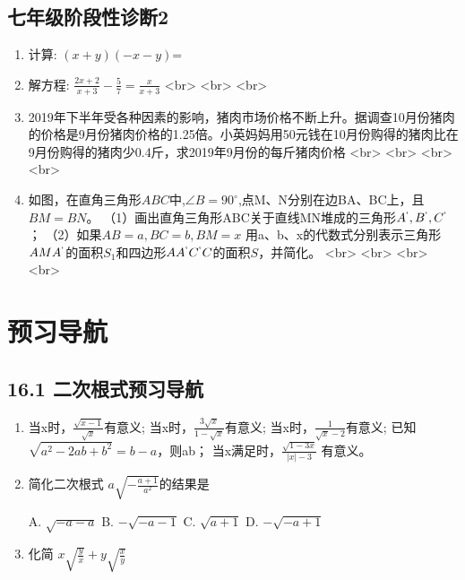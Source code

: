 \documentclass[UTF8]{ctexart}
\begin{document}
\subsection{七年级阶段性诊断2}

\begin{enumerate}

\item 计算: $(x+y)(-x-y)$=\underline{\quad\quad\quad}

\item 解方程: $\frac{2x+2}{x+3}-\frac{5}{7}=\frac{x}{x+3}$
   <br>
   <br>
   <br>

\item 2019年下半年受各种因素的影响，猪肉市场价格不断上升。据调查10月份猪肉的价格是9月份猪肉价格的1.25倍。小英妈妈用50元钱在10月份购得的猪肉比在9月份购得的猪肉少0.4斤，求2019年9月份的每斤猪肉价格
   <br>
   <br>
   <br>
   <br>

\item 如图，在直角三角形$ABC$中,$\angle B=90^\circ$,点M、N分别在边BA、BC上，且$BM=BN$。
   （1）画出直角三角形ABC关于直线MN堆成的三角形$A^`,B^`,C^`$；
   （2）如果$AB=a,BC=b,BM=x$ 用a、b、x的代数式分别表示三角形$AMA^`$的面积$S_1$和四边形$AA^`C^`C$的面积$S$，并简化。
   <br>
   <br>
   <br>
   <br>

 \end{enumerate}

\section{预习导航}

\subsection{16.1 二次根式预习导航}

\begin{enumerate}

\item 当x\underline{\quad\quad}时，$\frac{\sqrt{x-1}}{\sqrt{x}}$有意义;
   当x\underline{\quad\quad}时，$\frac{3\sqrt{x}}{1-\sqrt{x}}$有意义;
   当x\underline{\quad\quad}时，$\frac{1}{\sqrt{x}-2}$有意义;
   已知$\sqrt{a^2-2ab+b^2}=b-a$，则a\underline{\quad}b；
   当x满足\underline{\quad\quad}时，$\frac{\sqrt{1-3x}}{| x | - 3} $ 有意义。

\item 简化二次根式 $a\sqrt{-\frac{a+1}{a^2}}$的结果是\underline{\quad\quad}

    A. $\sqrt{-a-a}$
    B. $-\sqrt{-a-1}$
    C. $\sqrt{a+1}$
    D. $-\sqrt{-a+1}$
    
\item 化简 $x \sqrt{\frac{y}{x}} + y \sqrt{\frac{x}{y}}$

\end{enumerate}
   
\end{document}
